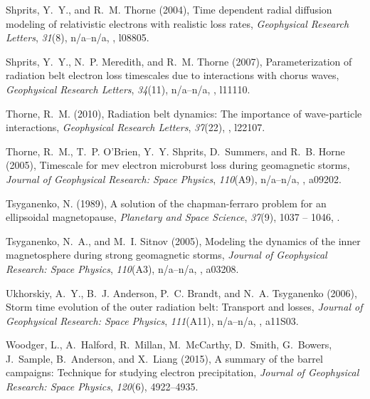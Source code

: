 \documentclass[draft, linenumbers]{agujournal}
\begin{document}
\begin{thebibliography}{35}
Shprits, Y.~Y., and R.~M. Thorne (2004), Time dependent radial diffusion
  modeling of relativistic electrons with realistic loss rates,
  \textit{Geophysical Research Letters}, \textit{31}(8), n/a--n/a,
  , l08805.

Shprits, Y.~Y., N.~P. Meredith, and R.~M. Thorne (2007), Parameterization of
  radiation belt electron loss timescales due to interactions with chorus
  waves, \textit{Geophysical Research Letters}, \textit{34}(11), n/a--n/a,
  , l11110.

Thorne, R.~M. (2010), Radiation belt dynamics: The importance of wave-particle
  interactions, \textit{Geophysical Research Letters}, \textit{37}(22),
  , l22107.

Thorne, R.~M., T.~P. O'Brien, Y.~Y. Shprits, D.~Summers, and R.~B. Horne
  (2005), Timescale for mev electron microburst loss during geomagnetic storms,
  \textit{Journal of Geophysical Research: Space Physics}, \textit{110}(A9),
  n/a--n/a, , a09202.

Tsyganenko, N. (1989), A solution of the chapman-ferraro problem for an
  ellipsoidal magnetopause, \textit{Planetary and Space Science},
  \textit{37}(9), 1037 -- 1046,
  .

Tsyganenko, N.~A., and M.~I. Sitnov (2005), Modeling the dynamics of the inner
  magnetosphere during strong geomagnetic storms, \textit{Journal of
  Geophysical Research: Space Physics}, \textit{110}(A3), n/a--n/a,
  , a03208.

Ukhorskiy, A.~Y., B.~J. Anderson, P.~C. Brandt, and N.~A. Tsyganenko (2006),
  Storm time evolution of the outer radiation belt: Transport and losses,
  \textit{Journal of Geophysical Research: Space Physics}, \textit{111}(A11),
  n/a--n/a, , a11S03.

Woodger, L., A.~Halford, R.~Millan, M.~McCarthy, D.~Smith, G.~Bowers,
  J.~Sample, B.~Anderson, and X.~Liang (2015), A summary of the barrel
  campaigns: Technique for studying electron precipitation, \textit{Journal of
  Geophysical Research: Space Physics}, \textit{120}(6), 4922--4935.

\end{thebibliography}
\end{document}
